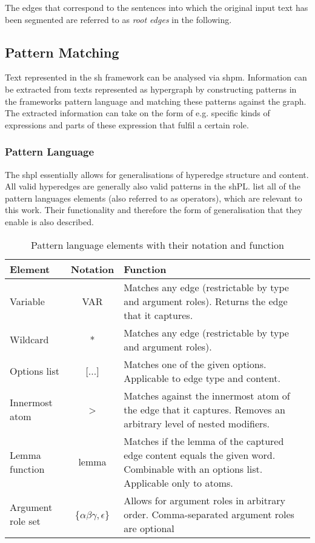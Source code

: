 \documentclass[11pt]{scrreprt}
\begin{document}
The edges that correspond to the sentences into which the original input text has been segmented are referred to as \textit{root edges} in the following. 


\subsection{Pattern Matching}
\label{sec:sh-pattern-matching}
Text represented in the \gls{sh} framework can be analysed via \gls{shpm}. Information can be extracted from texts represented as hypergraph by constructing patterns in the frameworks pattern language and matching these patterns against the graph. The extracted information can take on the form of e.g. specific kinds of expressions and parts of these expression that fulfil a certain role.


\subsubsection{Pattern Language}
\label{sec:sh-pattern-language}
The \gls{shpl} essentially allows for generalisations of hyperedge structure and content. All valid hyperedges are generally also valid patterns in the \gls{sh}PL.  list all of the pattern languages elements (also referred to as operators), which are relevant to this work. Their functionality and therefore the form of generalisation that they enable is also described.

\begin{table}[h]
\centering
\begin{tabular}{lcp{9cm}}
\toprule
\textbf{Element} & \textbf{Notation} & \textbf{Function} \\
\midrule
Variable & \textsf{VAR} & Matches any edge (restrictable by type and argument roles). Returns the edge that it captures. \\
Wildcard & \textsf{*} & Matches any edge (restrictable by type and argument roles). \\
Options list & \textsf{[...]} & Matches one of the given options. Applicable to edge type and content. \\
Innermost atom & \textsf{>} & Matches against the innermost atom of the edge that it captures. Removes an arbitrary level of nested modifiers. \\
Lemma function & \textsf{lemma} & Matches if the lemma of the captured edge content equals the given word. Combinable with an options list. Applicable only to atoms. \\
Argument role set & \textsf{\{\(\alpha\beta\gamma, \epsilon\)\}} & Allows for argument roles in arbitrary order. Comma-separated argument roles are optional \\
\bottomrule
\end{tabular}
\caption{Pattern language elements with their notation and function}
\label{tab:pattern-language-elements}
\end{table}
\end{document}
